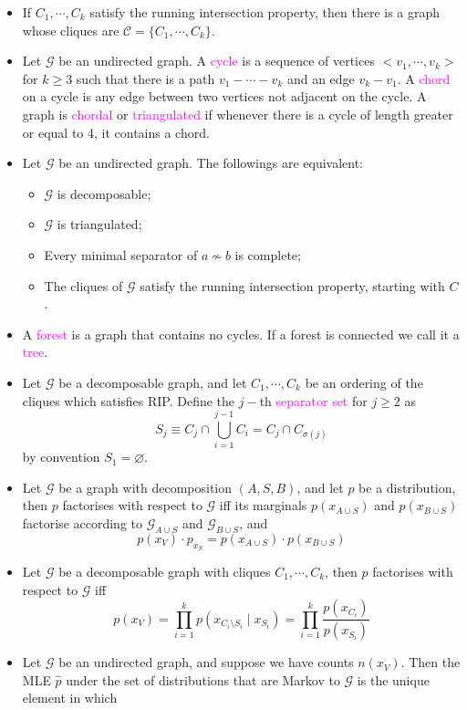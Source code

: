 \documentclass[UTF8]{book}
\newcommand{\concept}[1]{\textcolor{magenta}{#1}}
\begin{document}
\begin{itemize}
$$$$
\item If $C_1,\cdots,C_k$ satisfy the running intersection property, then there is a graph whose cliques are $\mathcal{C}=\{C_1,\cdots,C_k\}$.
\item Let $\mathcal{G}$ be an undirected graph. A \concept{cycle} is a sequence of vertices $<v_1,\cdots,v_k>$ for $k\geq 3$ such that there is a path $v_1 - \cdots - v_k$ and an edge $v_k - v_1$. A \concept{chord} on a cycle is any edge between two vertices not adjacent on the cycle. A graph is \concept{chordal} or \concept{triangulated} if whenever there is a cycle of length greater or equal to 4, it contains a chord.
\item Let $\mathcal{G}$ be an undirected graph. The followings are equivalent:
\begin{itemize}
	\item $\mathcal{G}$ is decomposable;
	\item $\mathcal{G}$ is triangulated;
	\item Every minimal separator of $a\not\sim b$ is complete;
	\item The cliques of $\mathcal{G}$ satisfy the running intersection property, starting with $C$.
\end{itemize}
\item A \concept{forest} is a graph that contains no cycles. If a forest is connected we call it a \concept{tree}.
\item Let $\mathcal{G}$ be a decomposable graph, and let $C_1,\cdots,C_k$ be an ordering of the cliques which satisfies RIP. Define the $j-$th \concept{separator set} for $j\geq 2$ as
$$
S_j \equiv C_j\cap \bigcup_{i=1}^{j-1} C_i = C_j\cap C_{\sigma(j)}
$$
by convention $S_1 = \varnothing$.
\item Let $\mathcal{G}$ be a graph with decomposition $(A,S,B)$, and let $p$ be a distribution, then $p$ factorises with respect to $\mathcal{G}$ iff its marginals $p(x_{A\cup S})$ and $p(x_{B\cup S})$ factorise according to $\mathcal{G}_{A\cup S}$ and $\mathcal{G}_{B\cup S}$, and
$$
p(x_V) \cdot p_{x_S} = p(x_{A\cup S})\cdot p(x_{B\cup S})
$$
\item Let $\mathcal{G}$ be a decomposable graph with cliques $C_1, \cdots, C_k$, then $p$ factorises with respect to $\mathcal{G}$ iff
$$
p(x_V) = \prod_{i=1}^k p(x_{C_i\setminus S_i}\mid x_{S_i}) = \prod_{i=1}^k\dfrac{p(x_{C_i})}{p(x_{S_i})}
$$
\item Let $\mathcal{G}$ be an undirected graph, and suppose we have counts $n(x_V)$. Then the MLE $\hat{p}$ under the set of distributions that are Markov to $\mathcal{G}$ is the unique element in which

\end{itemize}
\end{document}
